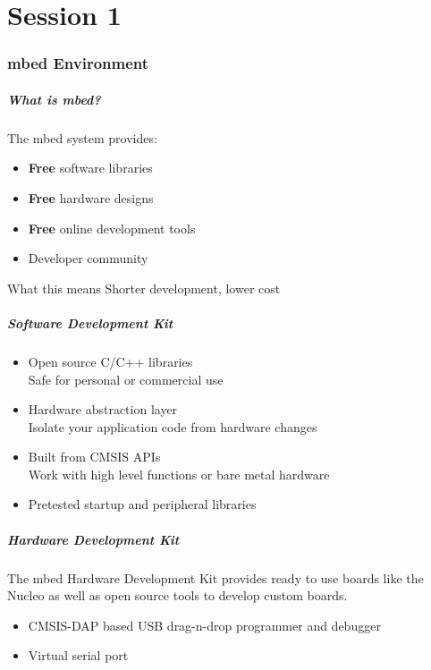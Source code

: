 \part{Session 1}

\section{mbed Environment}
\begin{frame}
	\frametitle{What is mbed?}
	The mbed system provides:
	\begin{itemize}
		\item \textbf{Free} software libraries
		\item \textbf{Free} hardware designs
		\item \textbf{Free} online development tools
		\item Developer community
	\end{itemize}
	\begin{block}{What this means}
		Shorter development, lower cost
	\end{block}
\end{frame}

\begin{frame}
	\frametitle{Software Development Kit}
	\begin{itemize}
		\item Open source C/C++ libraries\\
			Safe for personal or commercial use
		\item Hardware abstraction layer\\
			Isolate your application code from hardware changes
		\item Built from CMSIS APIs\\
			Work with high level functions or bare metal hardware
		\item Pretested startup and peripheral libraries
	\end{itemize}
\end{frame}

\begin{frame}
	\frametitle{Hardware Development Kit}
	The mbed Hardware Development Kit provides ready to use boards like the Nucleo as well as open source tools to develop custom boards.
	\begin{itemize}
		\item CMSIS-DAP based USB drag-n-drop programmer and debugger
		\item Virtual serial port
	\end{itemize}
\end{frame}

